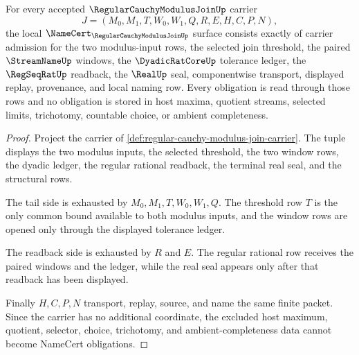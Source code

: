 \begin{theorem}
\label{thm:regular-cauchy-modulus-join-namecert-obligations}
For every accepted $\RegularCauchyModulusJoinUp$ carrier
$$
J=(M_0,M_1,T,W_0,W_1,Q,R,E,H,C,P,N),
$$
the local $\NameCert_{\RegularCauchyModulusJoinUp}$ surface consists exactly of carrier admission for the two modulus-input rows, the selected join threshold, the paired $\StreamNameUp$ windows, the $\DyadicRatCoreUp$ tolerance ledger, the $\RegSeqRatUp$ readback, the $\RealUp$ seal, componentwise transport, displayed replay, provenance, and local naming row. Every obligation is read through those rows and no obligation is stored in host maxima, quotient streams, selected limits, trichotomy, countable choice, or ambient completeness.
\end{theorem}
\begin{proof}
Project the carrier of \autoref{def:regular-cauchy-modulus-join-carrier}. The tuple displays the two modulus inputs, the selected threshold, the two window rows, the dyadic ledger, the regular rational readback, the terminal real seal, and the structural rows.

The tail side is exhausted by $M_0,M_1,T,W_0,W_1,Q$. The threshold row $T$ is the only common bound available to both modulus inputs, and the window rows are opened only through the displayed tolerance ledger.

The readback side is exhausted by $R$ and $E$. The regular rational row receives the paired windows and the ledger, while the real seal appears only after that readback has been displayed.

Finally $H,C,P,N$ transport, replay, source, and name the same finite packet. Since the carrier has no additional coordinate, the excluded host maximum, quotient, selector, choice, trichotomy, and ambient-completeness data cannot become NameCert obligations.
\end{proof}


